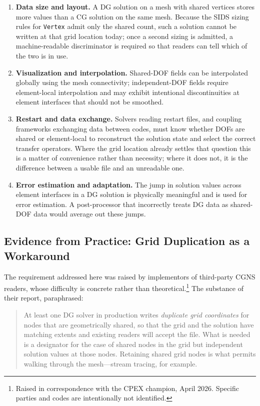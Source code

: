 \documentclass[11pt,letterpaper]{article}
\begin{document}
\begin{enumerate}[leftmargin=2em]
\item \textbf{Data size and layout.}  A DG solution on a mesh with
  shared vertices stores more values than a CG solution on the same
  mesh.  Because the SIDS sizing rules for \texttt{Vertex} admit only
  the shared count, such a solution cannot be written at that grid
  location today; once a second sizing is admitted, a machine-readable
  discriminator is required so that readers can tell which of the two
  is in use.

\item \textbf{Visualization and interpolation.}  Shared-DOF fields can be
  interpolated globally using the mesh connectivity; independent-DOF fields
  require element-local interpolation and may exhibit intentional
  discontinuities at element interfaces that should not be smoothed.

\item \textbf{Restart and data exchange.}  Solvers reading restart
  files, and coupling frameworks exchanging data between codes, must
  know whether DOFs are shared or element-local to reconstruct the
  solution state and select the correct transfer operators.  Where the
  grid location already settles that question this is a matter of
  convenience rather than necessity; where it does not, it is the
  difference between a usable file and an unreadable one.

\item \textbf{Error estimation and adaptation.}  The jump in solution
  values across element interfaces in a DG solution is physically
  meaningful and is used for error estimation.  A post-processor that
  incorrectly treats DG data as shared-DOF data would average out these
  jumps.
\end{enumerate}

\subsection{Evidence from Practice: Grid Duplication as a Workaround}
\label{sec:field-evidence}

The requirement addressed here was raised by implementors of third-party
CGNS readers, whose difficulty is concrete rather than
theoretical.\footnote{Raised in correspondence with the CPEX champion,
April 2026.  Specific parties and codes are intentionally not
identified.}  The substance of their report, paraphrased:

\begin{quote}
At least one DG solver in production writes \emph{duplicate grid
coordinates} for nodes that are geometrically shared, so that the grid
and the solution have matching extents and existing readers will accept
the file.  What is needed is a designator for the case of shared nodes
in the grid but independent solution values at those nodes.  Retaining
shared grid nodes is what permits walking through the mesh---stream
tracing, for example.
\end{quote}
\end{document}
